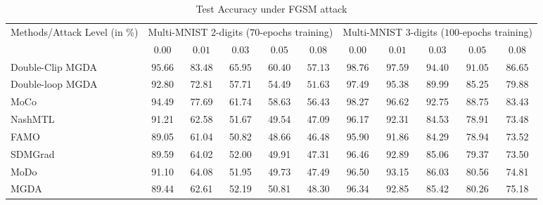 \documentclass[twoside]{article} %
\theoremstyle{plain}
\theoremstyle{definition}
\theoremstyle{remark}
\begin{document}
\begin{table}[!t]
\caption{Test Accuracy under FGSM attack}
\label{Table: Multi-mnist FGSM}
\centering
{
\scriptsize
\renewcommand{\arraystretch}{1.08}
\setlength{\tabcolsep}{1.5pt}


\begin{tabular*}{\textwidth}{
    @{\extracolsep{\fill}}
    lccccc|ccccc
    @{}
}
\toprule
\multirow{2}{*}{Methods/Attack Level (in \%)}
& \multicolumn{5}{c|}{Multi-MNIST 2-digits ($70$-epochs training)}
& \multicolumn{5}{c}{Multi-MNIST 3-digits ($100$-epochs training)} \\
\cmidrule(lr){2-6}\cmidrule(lr){7-11}
& $0.00$ & $0.01$ & $0.03$ & $0.05$ & $0.08$
& $0.00$ & $0.01$ & $0.03$ & $0.05$ & $0.08$ \\
\midrule
Double-Clip MGDA
& $\boldsymbol{95.66}$ & $\boldsymbol{83.48}$ & $\boldsymbol{65.95}$ & $\boldsymbol{60.40}$ & $\boldsymbol{57.13}$
& $\boldsymbol{98.76}$ & $\boldsymbol{97.59}$ & $\boldsymbol{94.40}$ & $\boldsymbol{91.05}$ & $\boldsymbol{86.65}$ \\

Double-loop MGDA
& 92.80 & 72.81 & 57.71 & 54.49 & $51.63$
& 97.49 & 95.38 & 89.99 & 85.25 & 79.88 \\

MoCo~\citep{MOCO}
& 94.49 & 77.69 & 61.74 & 58.63 & 56.43
& 98.27 & 96.62 & 92.75 & 88.75 & 83.43 \\

NashMTL~\citep{nashMTL}
& 91.21 & 62.58 & 51.67 & 49.54 & 47.09
& 96.17 & 92.31 & 84.53 & 78.91 & 73.48 \\

FAMO~\citep{FAMO}
& 89.05 & 61.04 & 50.82 & 48.66 & 46.48
& 95.90 & 91.86 & 84.29 & 78.94 & 73.52 \\

SDMGrad~\citep{SDMkaiyiJi}
& 89.59 & 64.02 & 52.00 & 49.91 & 47.31
& 96.46 & 92.89 & 85.06 & 79.37 & 73.50 \\

MoDo~\citep{MODO}
& 91.10 & 64.08 & 51.95 & 49.73 & 47.49
& 96.50 & 93.15 & 86.03 & 80.56 & 74.81 \\

MGDA~\citep{MGDA1stwork,qimgda}
& 89.44 & 62.61 & 52.19 & 50.81 & 48.30
& 96.34 & 92.85 & 85.42 & 80.26 & 75.18 \\
\bottomrule
\end{tabular*}}
\end{table}
\end{document}
